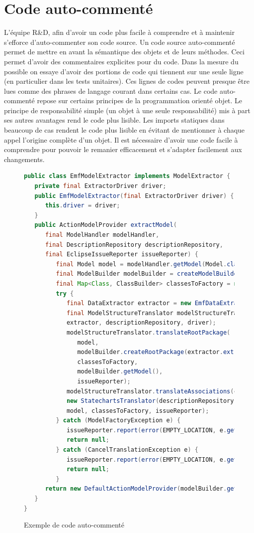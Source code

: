 \section{Code auto-commenté}\label{autoComm}
L'équipe R\&D, afin d'avoir un code plus facile à comprendre et à maintenir s'efforce d'auto-commenter son code source. Un code source auto-commenté permet de mettre en avant la sémantique des objets et de leurs méthodes. Ceci permet d'avoir des commentaires explicites pour du code. Dans la mesure du possible on essaye d'avoir des portions de code qui tiennent sur une seule ligne (en particulier dans les tests unitaires). Ces lignes de codes peuvent presque être lues comme des phrases de langage courant dans certains cas. Le code auto-commenté repose sur certains principes de la programmation orienté objet. Le principe de responsabilité simple (un objet à une seule responsabilité) mis à part ses autres avantages rend le code plus lisible. Les imports statiques dans beaucoup de cas rendent le code plus lisible en évitant de mentionner à chaque appel l'origine complète d'un objet. Il est nécessaire d'avoir une code facile à comprendre pour pouvoir le remanier efficacement et s'adapter facilement aux changements. 
\begin{figure}[!ht]
\centering
\begin{lstlisting}[language=java]
public class EmfModelExtractor implements ModelExtractor {
   private final ExtractorDriver driver;
   public EmfModelExtractor(final ExtractorDriver driver) {
      this.driver = driver;
   }
   public ActionModelProvider extractModel(
      final ModelHandler modelHandler,
      final DescriptionRepository descriptionRepository,
      final EclipseIssueReporter issueReporter) {
         final Model model = modelHandler.getModel(Model.class);
         final ModelBuilder modelBuilder = createModelBuilder(model.getName());
         final Map<Class, ClassBuilder> classesToFactory = new TreeMap<Class, ClassBuilder>(NAMED_ELEMENTS_COMPARATOR);
         try {
            final DataExtractor extractor = new EmfDataExtractor(driver);
            final ModelStructureTranslator modelStructureTranslator = new ModelStructureTranslator(
            extractor, descriptionRepository, driver);
            modelStructureTranslator.translateRootPackage(
               model,
               modelBuilder.createRootPackage(extractor.extractUniqueIdentifier(model), "root"),
               classesToFactory,
               modelBuilder.getModel(),
               issueReporter);
            modelStructureTranslator.translateAssociations(classesToFactory, model, issueReporter);
            new StatechartsTranslator(descriptionRepository, driver).translateStatecharts(
            model, classesToFactory, issueReporter);
         } catch (ModelFactoryException e) {
            issueReporter.report(error(EMPTY_LOCATION, e.getMessageBundle()));
            return null;
         } catch (CancelTranslationException e) {
            issueReporter.report(error(EMPTY_LOCATION, e.getMessageBundle()));
            return null;
         }
      return new DefaultActionModelProvider(modelBuilder.getModel());
   }
}
\end{lstlisting}
\caption{Exemple de code auto-commenté}
\label{figure:codeAutoCom}
\end{figure}
